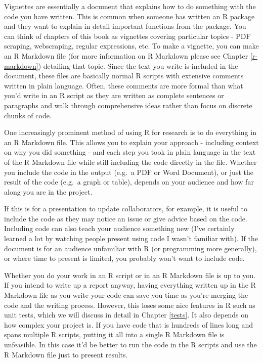 \documentclass[
]{krantz}
\begin{document}
Vignettes are essentially a document that explains how to do
something with the code you have written. This is common
when someone has written an R package and they want to
explain in detail important functions from the package. You
can think of chapters of this book as vignettes covering
particular topics - PDF scraping, webscraping, regular
expressions, etc. To make a vignette, you can make an R
Markdown file (for more information on R Markdown please see
Chapter \ref{r-markdown}) detailing that topic. Since the
text you write is included in the document, these files are
basically normal R scripts with extensive comments written
in plain language. Often, these comments are more formal
than what you'd write in an R script as they are written as
complete sentences or paragraphs and walk through
comprehensive ideas rather than focus on discrete chunks of
code.

One increasingly prominent method of using R for research is
to do everything in an R Markdown file. This allows you to
explain your approach - including context on why you did
something - and each step you took in plain language in the
text of the R Markdown file while still including the code
directly in the file. Whether you include the code in the
output (e.g.~a PDF or Word Document), or just the result of
the code (e.g.~a graph or table), depends on your audience
and how far along you are in the project.

If this is for a presentation to update collaborators, for
example, it is useful to include the code as they may notice
an issue or give advice based on the code. Including code
can also teach your audience something new (I've certainly
learned a lot by watching people present using code I wasn't
familiar with). If the document is for an audience
unfamiliar with R (or programming more generally), or where
time to present is limited, you probably won't want to
include code.

Whether you do your work in an R script or in an R Markdown
file is up to you. If you intend to write up a report
anyway, having everything written up in the R Markdown file
as you write your code can save you time as you're merging
the code and the writing process. However, this loses some
nice features in R such as unit tests, which we will discuss
in detail in Chapter \ref{tests}. It also depends on how
complex your project is. If you have code that is hundreds
of lines long and spans multiple R scripts, putting it all
into a single R Markdown file is unfeasible. In this case
it'd be better to run the code in the R scripts and use the
R Markdown file just to present results.
\end{document}
